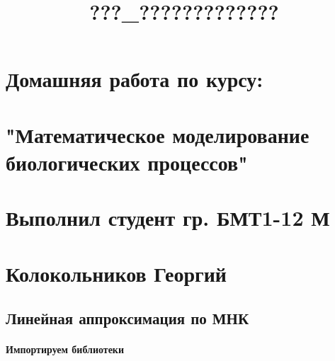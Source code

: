 \documentclass[11pt]{article}
\title{???\_?????????????}
\begin{document}
    
    
    \maketitle
    
    

    
    \section{Домашняя работа по
курсу:}\label{ux434ux43eux43cux430ux448ux43dux44fux44f-ux440ux430ux431ux43eux442ux430-ux43fux43e-ux43aux443ux440ux441ux443}

\section{"Математическое моделирование биологических
процессов"}\label{ux43cux430ux442ux435ux43cux430ux442ux438ux447ux435ux441ux43aux43eux435-ux43cux43eux434ux435ux43bux438ux440ux43eux432ux430ux43dux438ux435-ux431ux438ux43eux43bux43eux433ux438ux447ux435ux441ux43aux438ux445-ux43fux440ux43eux446ux435ux441ux441ux43eux432}

\section{Выполнил студент гр. БМТ1-12
М}\label{ux432ux44bux43fux43eux43bux43dux438ux43b-ux441ux442ux443ux434ux435ux43dux442-ux433ux440.-ux431ux43cux4421-12-ux43c}

\section{Колокольников
Георгий}\label{ux43aux43eux43bux43eux43aux43eux43bux44cux43dux438ux43aux43eux432-ux433ux435ux43eux440ux433ux438ux439}

    \subsection{Линейная аппроксимация по
МНК}\label{ux43bux438ux43dux435ux439ux43dux430ux44f-ux430ux43fux43fux440ux43eux43aux441ux438ux43cux430ux446ux438ux44f-ux43fux43e-ux43cux43dux43a}

    \paragraph{Импортируем
библиотеки}\label{ux438ux43cux43fux43eux440ux442ux438ux440ux443ux435ux43c-ux431ux438ux431ux43bux438ux43eux442ux435ux43aux438}
\end{document}
